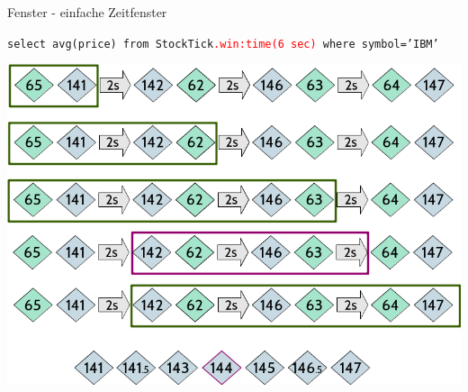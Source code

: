 \documentclass{beamer}
\begin{document}
\begin{frame}{Fenster - einfache Zeitfenster}

\begin{exampleblock}{}
    \begin{center}
        \texttt{select  avg(price) from StockTick\textcolor{red}{.win:time(6 sec)} where 
        symbol='IBM'}
    \end{center}
\end{exampleblock}

\begin{center}
    \includegraphics[scale=0.40]{img/solution-3}
\end{center}

\end{frame}
\end{document}
